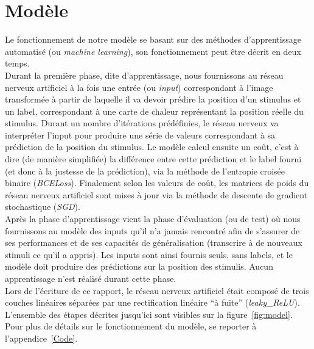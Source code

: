 \section{Modèle}
Le fonctionnement de notre modèle se basant sur des méthodes d'apprentissage automatisé (ou \textit{machine learning}), son fonctionnement peut être décrit en deux temps.\\
Durant la première phase, dite d'apprentissage, nous fournissons au réseau nerveux artificiel à la fois une entrée (ou \textit{input}) correspondant à l'image transformée à partir de laquelle il va devoir prédire la position d'un stimulus et un label, correspondant à une carte de chaleur représentant la position réelle du stimulus. 
Durant un nombre d'itérations prédéfinies, le réseau nerveux va interpréter l'input pour produire une série de valeurs correspondant à sa prédiction de la position du stimulus.
Le modèle calcul ensuite un coût, c'est à dire (de manière simplifiée) la différence entre cette prédiction et le label fourni (et donc à la justesse de la prédiction), via la méthode de l'entropie croisée binaire (\textit{BCELoss}).
Finalement selon les valeurs de coût, les matrices de poids du réseau nerveux artificiel sont mises à jour via la méthode de descente de gradient stochastique (\textit{SGD}). \\
Après la phase d'apprentissage vient la phase d'évaluation (ou de test) où nous fournissons au modèle des inputs qu'il n'a jamais rencontré afin de s'assurer de ses performances et de ses capacités de généralisation (transcrire à de nouveaux stimuli ce qu'il a appris).
Les inputs sont ainsi fournis seuls, sans labels, et le modèle doit produire des prédictions sur la position des stimulis.
Aucun apprentissage n'est réalisé durant cette phase. \\
Lors de l'écriture de ce rapport, le réseau nerveux artificiel était composé de trois couches linéaires séparées par une rectification linéaire ``à fuite'' (\textit{leaky\_ReLU}).
L'ensemble des étapes décrites jusqu'ici sont visibles sur la figure~\ref{fig:model}.
Pour plus de détails sur le fonctionnement du modèle, se reporter à l'appendice~\ref{Code}.
